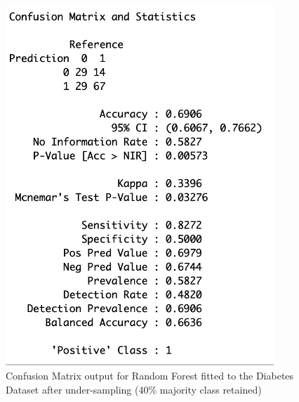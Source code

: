 \begin{figure}[!htbp]
\begin{minipage}{0.45\textwidth}
        \includegraphics[width=0.9\textwidth]{ThesisTemplate/appendix/images/Chapter5Appendix/ConfusionMatrix40/Diabetes.png}
        \caption{Confusion Matrix output for Random Forest fitted to the Diabetes Dataset after under-sampling (40\% majority class retained)}
        \label{fig:matrixDia40}
    \end{minipage}
\end{figure}

